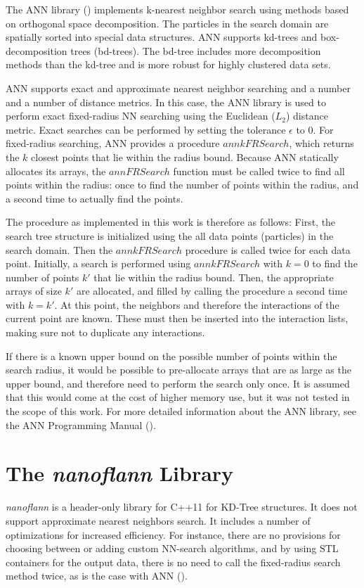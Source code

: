 The ANN library (\cite{ANN10}) implements k-nearest neighbor search using methods based on orthogonal space decomposition. The particles in the search domain are spatially sorted into special data structures. ANN supports kd-trees and box-decomposition trees (bd-trees). The bd-tree includes more decomposition methods than the kd-tree and is more robust for highly clustered data sets. 

ANN supports exact and approximate nearest neighbor searching and a number and a number of distance metrics. In this case, the ANN library is used to perform exact fixed-radius NN searching using the Euclidean ($L_2$) distance metric. Exact searches can be performed by setting the tolerance $\epsilon$ to 0. For fixed-radius searching, ANN provides a procedure $annkFRSearch$, which returns the $k$ closest points that lie within the radius bound. Because ANN statically allocates its arrays, the $annFRSearch$ function must be called twice to find all points within the radius: once to find the number of points within the radius, and a second time to actually find the points.

The procedure as implemented in this work is therefore as follows:  First, the search tree structure is initialized using the all data points (particles) in the search domain. Then the $annkFRSearch$ procedure is called twice for each data point. Initially, a search is performed using $annkFRSearch$ with $k = 0$ to find the number of points $k'$ that lie within the radius bound.  Then, the appropriate arrays of size $k'$ are allocated, and filled by calling the procedure a second time with $k = k'$. At this point, the neighbors and therefore the interactions of the current point are known. These must then be inserted into the interaction lists, making sure not to duplicate any interactions.

If there is a known upper bound on the possible number of points within the search radius, it would be possible to pre-allocate arrays that are as large as the upper bound, and therefore need to perform the search only once. It is assumed that this would come at the cost of higher memory use, but it was not tested in the scope of this work. For more detailed information about the ANN library, see the ANN Programming Manual (\cite{Mount10}).

\section{The {\itshape nanoflann} Library}
\label{SECTION:NanoFLANN}
{\itshape nanoflann} is a header-only library for C++11 for KD-Tree structures.  It does not support approximate nearest neighbors search.  It includes a number of optimizations for increased efficiency.  For instance, there are no provisions for choosing between or adding custom NN-search algorithms, and by using STL containers for the output data, there is no need to call the fixed-radius search method twice, as is the case with ANN (\cite{blanco2014nanoflann}).

